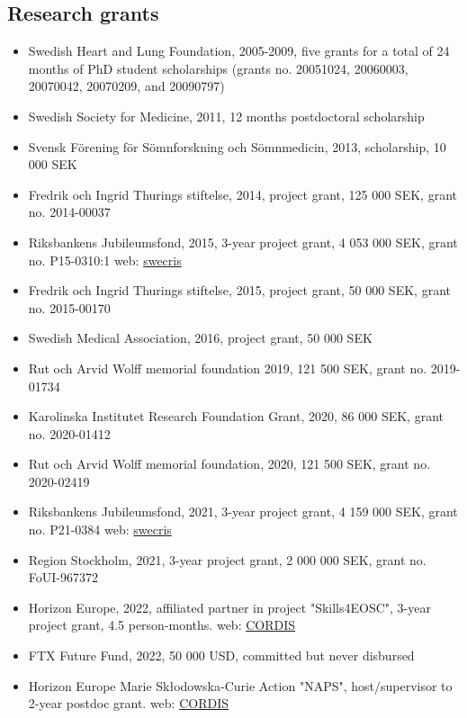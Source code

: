 \documentclass[10pt]{article}
\begin{document}
\subsection*{Research grants}
\begin{itemize}[nolistsep]
\item Swedish Heart and Lung Foundation, 2005-2009, five grants for a total of 24 months of PhD student scholarships (grants no. 20051024, 20060003, 20070042, 20070209, and 20090797)
\item Swedish Society for Medicine, 2011, 12 months postdoctoral scholarship
\item Svensk Förening för Sömnforskning och Sömnmedicin, 2013, scholarship, 10 000 SEK 
\item Fredrik och Ingrid Thurings stiftelse, 2014, project grant, 125 000 SEK, grant no. 2014-00037
\item Riksbankens Jubileumsfond, 2015, 3-year project grant, 4 053 000 SEK, grant no. P15-0310:1
web: \href{https://www.vr.se/english/swecris.html#/project/P15-0310:1_RJ}{swecris}
\item Fredrik och Ingrid Thurings stiftelse, 2015, project grant, 50 000 SEK, grant no. 2015-00170
\item Swedish Medical Association, 2016, project grant, 50 000 SEK
\item Rut och Arvid Wolff memorial foundation 2019, 121 500 SEK, grant no. 2019-01734
\item Karolinska Institutet Research Foundation Grant, 2020, 86 000 SEK, grant no. 2020-01412
\item Rut och Arvid Wolff memorial foundation, 2020, 121 500 SEK, grant no. 2020-02419
\item Riksbankens Jubileumsfond, 2021, 3-year project grant, 4 159 000 SEK, grant no. P21-0384
web: \href{https://www.vr.se/english/swecris.html#/project/P21-0384_RJ}{swecris}
\item Region Stockholm, 2021, 3-year project grant, 2 000 000 SEK, grant no. FoUI-967372
\item Horizon Europe, 2022, affiliated partner in project "Skills4EOSC", 3-year project grant, 4.5 person-months. web: \href{https://cordis.europa.eu/project/id/101058527}{CORDIS}
\item FTX Future Fund, 2022, 50 000 USD, committed but never disbursed
\item Horizon Europe Marie Skłodowska-Curie Action "NAPS", host/supervisor to 2-year postdoc grant. web: \href{https://cordis.europa.eu/project/id/101111182}{CORDIS}

\end{itemize}
\end{document}
